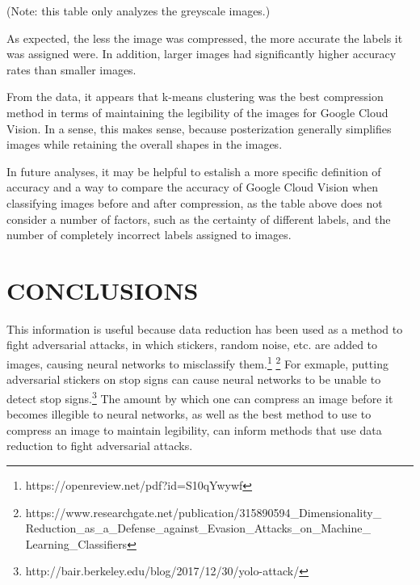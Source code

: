 \documentclass[letterpaper, 10 pt, conference]{ieeeconf}  %
\begin{document}
\vspace*{2mm}
(Note: this table only analyzes the greyscale images.)
\vspace*{2mm}

As expected, the less the image was compressed, the more accurate
the labels it was assigned were. In addition, larger images
had significantly higher accuracy rates than smaller images.

From the data, it appears that k-means clustering was
the best compression method in terms of maintaining the legibility
of the images for Google Cloud Vision. In a sense, this makes
sense, because posterization generally simplifies images while
retaining the overall shapes in the images.

In future analyses, it may be helpful to estalish a more
specific definition of accuracy and a way to compare
the accuracy of Google Cloud Vision when classifying
images before and after compression, as the table
above does not consider a number of factors, such as
the certainty of different labels, and the number
of completely incorrect labels assigned to images.

\section{CONCLUSIONS}

This information
is useful because data reduction has been used as a method to fight
adversarial attacks, in which stickers, random noise, etc. are added to images,
causing neural networks to misclassify them.\footnote{https://openreview.net/pdf?id=S10qYwywf}
\footnote{https://www.researchgate.net/publication/315890594\_Dimensionality\_ Reduction\_as\_a\_Defense\_against\_Evasion\_Attacks\_on\_Machine\_ Learning\_Classifiers}
For exmaple, putting adversarial stickers on stop signs
can cause neural networks to be unable to detect stop signs.\footnote{http://bair.berkeley.edu/blog/2017/12/30/yolo-attack/}
The amount by which one can compress an image before it becomes
illegible to neural networks, as well as the best method to use to compress an
image to maintain legibility, can inform methods that use data reduction
to fight adversarial attacks.

\addtolength{\textheight}{-12cm}   %
\end{document}
